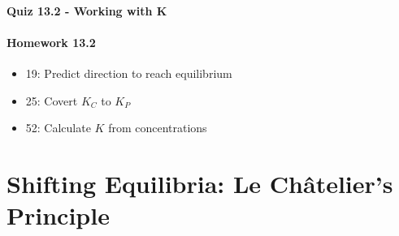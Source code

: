 \documentclass[12pt, openany, letterpaper]{memoir}
\begin{document}
\paragraph*{Quiz 13.2 - Working with K}
\paragraph*{Homework 13.2}
\begin{itemize}
  \item 19: Predict direction to reach equilibrium
  \item 25: Covert $K_C$ to $K_P$
  \item 52: Calculate $K$ from concentrations
\end{itemize}

\section{Shifting Equilibria: Le Ch\^atelier's Principle}
\end{document}

